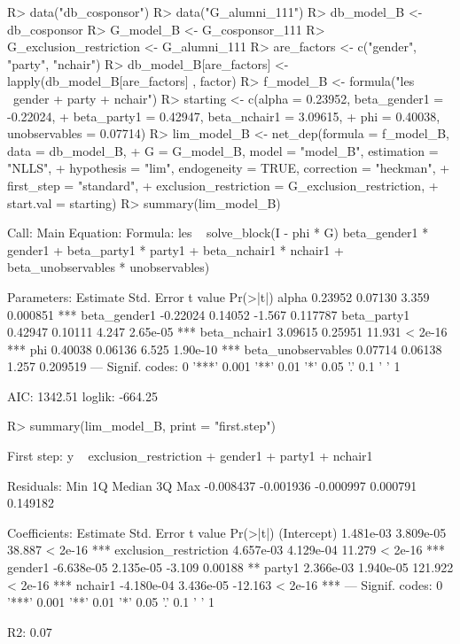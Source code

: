 \documentclass[nojss]{jss}
\begin{document}
\begin{CodeChunk}
\begin{CodeInput}
R> data("db_cosponsor")
R> data("G_alumni_111")
R> db_model_B <- db_cosponsor
R> G_model_B <- G_cosponsor_111
R> G_exclusion_restriction <- G_alumni_111
R> are_factors <- c("gender", "party", "nchair")
R> db_model_B[are_factors] <- lapply(db_model_B[are_factors] , factor)
R> f_model_B <- formula("les ~gender + party + nchair")
R> starting <- c(alpha = 0.23952, beta_gender1 = -0.22024,
+    beta_party1 = 0.42947, beta_nchair1 = 3.09615,
+    phi = 0.40038, unobservables = 0.07714)
R> lim_model_B <- net_dep(formula = f_model_B, data = db_model_B,
+    G = G_model_B, model = "model_B", estimation = "NLLS",
+    hypothesis = "lim", endogeneity = TRUE, correction = "heckman",
+    first_step = "standard", 
+    exclusion_restriction = G_exclusion_restriction, 
+    start.val = starting)
R> summary(lim_model_B)
\end{CodeInput}
\begin{CodeOutput}
Call:
Main Equation:  
Formula: les ~ solve_block(I - phi * G) %
beta_gender1 * gender1 + beta_party1 * party1 + 
beta_nchair1 * nchair1 + beta_unobservables * unobservables)

Parameters:
			Estimate Std. Error t value Pr(>|t|)    
alpha               0.23952    0.07130   3.359 0.000851 ***
beta_gender1       -0.22024    0.14052  -1.567 0.117787    
beta_party1         0.42947    0.10111   4.247 2.65e-05 ***
beta_nchair1        3.09615    0.25951  11.931  < 2e-16 ***
phi                 0.40038    0.06136   6.525 1.90e-10 ***
beta_unobservables  0.07714    0.06138   1.257 0.209519    
---
Signif. codes:  0 '***' 0.001 '**' 0.01 '*' 0.05 '.' 0.1 ' ' 1

AIC: 1342.51  loglik: -664.25
\end{CodeOutput}
\begin{CodeInput}
R> summary(lim_model_B, print = "first.step")
\end{CodeInput}
\begin{CodeOutput}
First step:  y ~ exclusion_restriction + gender1 + party1 + nchair1

Residuals:
Min        1Q    Median        3Q       Max 
-0.008437 -0.001936 -0.000997  0.000791  0.149182 

Coefficients:
			Estimate Std. Error t value Pr(>|t|)    
(Intercept)            1.481e-03  3.809e-05  38.887  < 2e-16 ***
exclusion_restriction  4.657e-03  4.129e-04  11.279  < 2e-16 ***
gender1               -6.638e-05  2.135e-05  -3.109  0.00188 ** 
party1                 2.366e-03  1.940e-05 121.922  < 2e-16 ***
nchair1               -4.180e-04  3.436e-05 -12.163  < 2e-16 ***
---
Signif. codes:  0 '***' 0.001 '**' 0.01 '*' 0.05 '.' 0.1 ' ' 1

R2: 0.07
\end{CodeOutput}
\end{CodeChunk}
\end{document}
